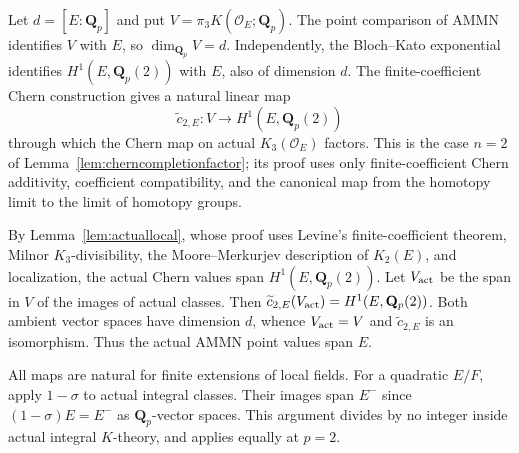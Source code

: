 
Let $d=[E:\mathbf Q_p]$ and put
$V=\pi_3K(\mathcal O_E;\mathbf Q_p)$.
The point comparison of AMMN identifies $V$ with $E$, so
$\dim_{\mathbf Q_p}V=d$. Independently, the Bloch--Kato exponential
identifies $H^1(E,\mathbf Q_p(2))$ with $E$, also of dimension $d$.
The finite-coefficient Chern construction gives a natural linear map
\[
 \widetilde c_{2,E}:V\longrightarrow H^1(E,\mathbf Q_p(2))
\]
through which the Chern map on actual $K_3(\mathcal O_E)$ factors.
This is the case $n=2$ of Lemma~\ref{lem:cherncompletionfactor};
its proof uses only finite-coefficient Chern additivity,
coefficient compatibility, and the canonical map from the homotopy
limit to the limit of homotopy groups.

By Lemma~\ref{lem:actuallocal}, whose proof uses Levine's
finite-coefficient theorem, Milnor $K_3$-divisibility, the
Moore--Merkurjev description of $K_2(E)$, and localization,
the actual Chern values span $H^1(E,\mathbf Q_p(2))$.
Let $V_{\rm act}$ be the span in $V$ of the images of actual classes.
Then $\widetilde c_{2,E}(V_{\rm act})=H^1(E,\mathbf Q_p(2))$.
Both ambient vector spaces have dimension $d$, whence
$V_{\rm act}=V$ and $\widetilde c_{2,E}$ is an isomorphism.
Thus the actual AMMN point values span $E$.

All maps are natural for finite extensions of local fields.
For a quadratic $E/F$, apply $1-\sigma$ to actual integral classes.
Their images span $E^-$ since $(1-\sigma)E=E^-$ as
$\mathbf Q_p$-vector spaces. This argument divides by no integer
inside actual integral $K$-theory, and applies equally at $p=2$.

